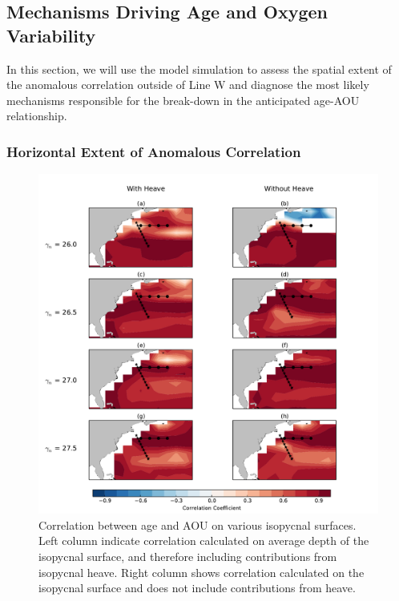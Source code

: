 \subsection{Mechanisms Driving Age and Oxygen Variability}
In this section, we will use the model simulation to assess the spatial extent of the anomalous correlation outside of Line W and diagnose the most likely mechanisms responsible for the break-down in the anticipated age-AOU relationship.

\subsubsection{Horizontal Extent of Anomalous Correlation}

\begin{figure}
\centering
\includegraphics[width=\linewidth]{age_aou_corr_iso_sfc.pdf}
\caption{Correlation between age and AOU on various isopycnal surfaces. Left column indicate correlation calculated on average depth of the isopycnal surface, and therefore including contributions from isopycnal heave. Right column shows correlation calculated on the isopycnal surface and does not include contributions from heave.}
\label{fig:fig6}
\end{figure}

